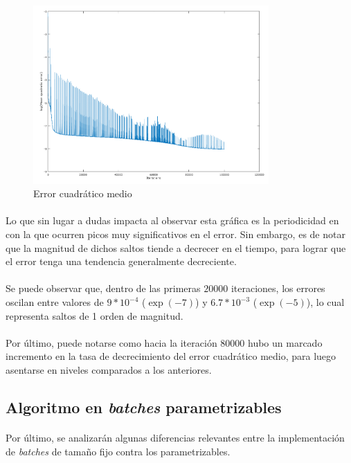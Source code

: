 \documentclass[12pt, twocolumn]{article}
\begin{document}
	\begin{figure}[H]
		\centering
		\includegraphics[width=9cm]{../results/batch_momentum/2/log_batch.png}
		\caption{Error cuadrático medio}
		\label{error2}
	\end{figure}
	
	\paragraph{} Lo que sin lugar a dudas impacta al observar esta gráfica es la periodicidad en con la que ocurren picos muy significativos en el error. Sin embargo, es de notar que la magnitud de dichos saltos tiende a decrecer en el tiempo, para lograr que el error tenga una tendencia generalmente decreciente. 
	
	\paragraph{} Se puede observar que, dentro de las primeras $20000$ iteraciones, los errores oscilan entre valores de $9*10^{-4}$ ($\exp(-7)$) y $6.7*10^{-3}$ ($\exp(-5)$), lo cual representa saltos de 1 orden de magnitud. 
	
	\paragraph{} Por último, puede notarse como hacia la iteración 80000 hubo un marcado incremento en la tasa de decrecimiento del error cuadrático medio, para luego asentarse en niveles comparados a los anteriores. 
	
	\subsection{Algoritmo en \textit{batches} parametrizables}
	
	\paragraph{} Por último, se analizarán algunas diferencias relevantes entre la implementación de \textit{batches} de tamaño fijo contra los parametrizables.
	
\end{document}
